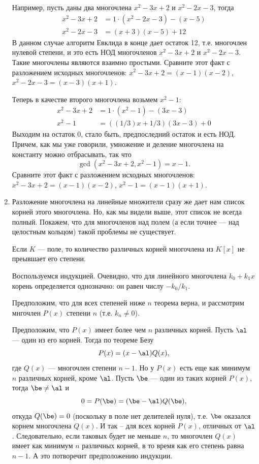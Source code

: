 \begin{enumerate}
Например, пусть даны два многочлена $x^2-3x+2$ и $x^2-2x-3$, тогда
\begin{align*}
x^2-3x+2 & = 1\cdot(x^2-2x-3) - (x-5) \\
x^2-2x-3 & = (x+3)(x-5) + 12
\end{align*}
В данном случае алгоритм Евклида в конце дает остаток 12, т.е. многочлен нулевой степени, и это есть НОД многочленов $x^2-3x+2$ и $x^2-2x-3$. Такие многочлены являются взаимно простыми.
Сравните этот факт с разложением исходных многочленов: $x^2-3x+2=(x-1)(x-2)$, $x^2-2x-3=(x-3)(x+1)$.

Теперь в качестве второго многочлена возьмем $x^2-1$:
\begin{align*}
x^2-3x+2 & = 1\cdot(x^2-1) - (3x-3) \\
x^2-1 & = ((1/3)x+1/3)(3x-3) + 0
\end{align*}
Выходим на остаток 0, стало быть, предпоследний остаток и есть НОД. Причем, как мы уже говорили, умножение и деление многочлена на константу можно отбрасывать, так что
$$
\gcd(x^2-3x+2,x^2-1) = x-1.
$$
Сравните этот факт с разложением исходных многочленов: $x^2-3x+2=(x-1)(x-2)$, $x^2-1=(x-1)(x+1)$.

\item Разложение многочлена на линейные множители сразу же дает нам список корней этого многочлена. Но, как мы видели выше, этот список не всегда полный. Покажем, что для многочленов над полем (а если точнее --- над целостным кольцом) такой проблемы не существует.
\begin{thrm}
Если $K$ --- поле, то количество различных корней многочлена из $K[x]$ не преывшает его степени.
\end{thrm}
\pf
Воспользуемся индукцией. Очевидно, что для линейного многочлена $k_0+k_1x$ корень определяется однозначно: он равен числу $-k_0/k_1$.

Предположим, что для всех степеней ниже $n$ теорема верна, и рассмотрим мнгочлен $P(x)$ степени $n$ (т.е. $k_n\ne 0$).

Предположим, что $P(x)$ имеет более чем $n$ различных корней. Пусть $\al$ --- один из его корней. Тогда по теореме Безу
\begin{equation}\label{PQ}
P(x)=(x-\al)Q(x),
\end{equation}
где $Q(x)$ --- многочлен степени $n-1$. Но у $P(x)$ есть еще как минимум $n$ различных корней, кроме $\al$. Пусть $\be$ --- один из таких корней $P(x)$, тогда $\be\ne\al$ и
$$
0=P(\be)=(\be-\al)Q(\be),
$$
откуда $Q(\be)=0$ (поскольку в поле нет делителей нуля),
т.е. $\be$ оказался корнем многочлена $Q(x)$. И так -- для всех корней $P(x)$, отличных от $\al$. Следовательно, если таковых будет не меньше $n$, то многочлен $Q(x)$ имеет как минимум $n$ различных корней, в то время как его степень равна $n-1$. А это потворечит предположению индукции.


\end{enumerate}

